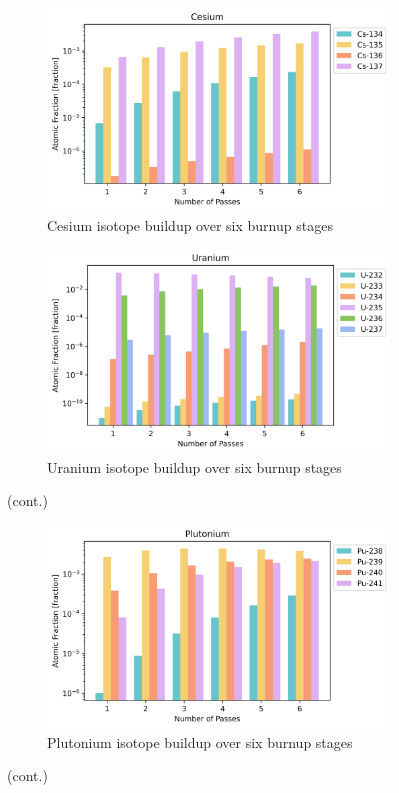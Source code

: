 \begin{figure}[H]\ContinuedFloat
\centering

\begin{subfigure}{0.8\textwidth}
  \includegraphics[width=\linewidth]{figures/compositions/caesium}
  \caption{Cesium isotope buildup over six burnup stages}
  \label{fig:cs}
\end{subfigure}%


\begin{subfigure}{0.8\textwidth}
  \includegraphics[width=\linewidth]{figures/compositions/uranium}
  \caption{Uranium isotope buildup over six burnup stages}
  \label{fig:u}
\end{subfigure}%

\caption[]{(cont.)}
\end{figure}

\begin{figure}[H]\ContinuedFloat
\centering

\begin{subfigure}{0.8\textwidth}
  \includegraphics[width=\linewidth]{figures/compositions/plutonium}
  \caption{Plutonium isotope buildup over six burnup stages}
  \label{fig:pu}
\end{subfigure}%

\caption[]{(cont.)}
\label{fig:comps}
\end{figure}